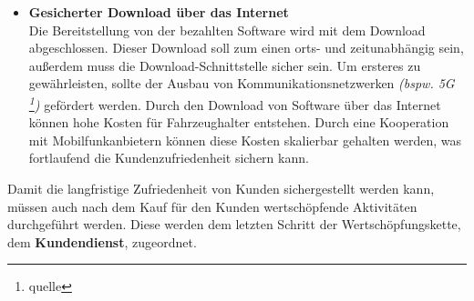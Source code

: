 \begin{itemize}
	\item[] \hspace{-0.6cm} \textbf{Gesicherter Download über das Internet}\\
	Die Bereitstellung von der bezahlten Software wird mit dem Download abgeschlossen. Dieser Download soll zum einen orts- und zeitunabhängig sein, außerdem muss die Download-Schnittstelle sicher sein. Um ersteres zu gewährleisten, sollte der Ausbau von Kommunikationsnetzwerken \textit{(bspw. 5G \footnote{quelle})} gefördert werden. Durch den Download von Software über das Internet können hohe Kosten für Fahrzeughalter entstehen. Durch eine Kooperation mit Mobilfunkanbietern können diese Kosten skalierbar gehalten werden, was fortlaufend die Kundenzufriedenheit sichern kann.
\end{itemize}
Damit die langfristige Zufriedenheit von Kunden sichergestellt werden kann, müssen auch nach dem Kauf für den Kunden wertschöpfende Aktivitäten durchgeführt werden. Diese werden dem letzten Schritt der Wertschöpfungskette, dem \textbf{Kundendienst}, zugeordnet.	
